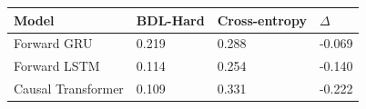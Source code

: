\begin{tabular}{llll}
\toprule
Model & BDL-Hard & Cross-entropy & $\Delta$ \\
\midrule
Forward GRU & 0.219 & 0.288 & -0.069 \\
Forward LSTM & 0.114 & 0.254 & -0.140 \\
Causal Transformer & 0.109 & 0.331 & -0.222 \\
\bottomrule
\end{tabular}
